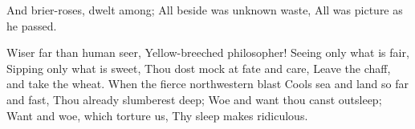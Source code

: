\begin{poem}
\begin{stanza}
		And brier-roses, dwelt among;\verseline
		All beside was unknown waste,\verseline
		All was picture as he passed.\verseline
	\end{stanza}
	\begin{stanza}
		Wiser far than human seer,\verseline
		Yellow-breeched philosopher!\verseline
		Seeing only what is fair,\verseline
		Sipping only what is sweet,\verseline
		Thou dost mock at fate and care,\verseline
		Leave the chaff, and take the wheat.\verseline
		When the fierce northwestern blast\verseline
		Cools sea and land so far and fast,\verseline
		Thou already slumberest deep;\verseline
		Woe and want thou canst outsleep;\verseline
		Want and woe, which torture us,\verseline
		Thy sleep makes ridiculous.\verseline
	\end{stanza}
\end{poem}
